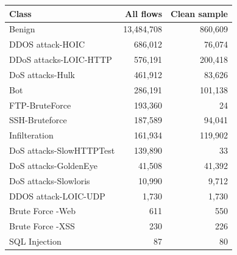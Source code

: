 \begin{tabular}{lrr}
\toprule
Class & All flows & Clean sample \\
\midrule
Benign & 13,484,708 & 860,609 \\
DDOS attack-HOIC & 686,012 & 76,074 \\
DDoS attacks-LOIC-HTTP & 576,191 & 200,418 \\
DoS attacks-Hulk & 461,912 & 83,626 \\
Bot & 286,191 & 101,138 \\
FTP-BruteForce & 193,360 & 24 \\
SSH-Bruteforce & 187,589 & 94,041 \\
Infilteration & 161,934 & 119,902 \\
DoS attacks-SlowHTTPTest & 139,890 & 33 \\
DoS attacks-GoldenEye & 41,508 & 41,392 \\
DoS attacks-Slowloris & 10,990 & 9,712 \\
DDOS attack-LOIC-UDP & 1,730 & 1,730 \\
Brute Force -Web & 611 & 550 \\
Brute Force -XSS & 230 & 226 \\
SQL Injection & 87 & 80 \\
\bottomrule
\end{tabular}

